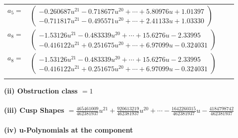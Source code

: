 \documentclass[1p]{elsarticle_modified}
\theoremstyle{definition}
\begin{document}
\begin{tabular}{m{7pt} m{180pt} m{7pt} m{180pt} }
\flushright $a_{5}=$&$\begin{pmatrix}-0.260687 u^{21}-0.718677 u^{20}+\cdots+5.80976 u+1.01397\\-0.711817 u^{21}-0.495571 u^{20}+\cdots+2.41133 u+1.03330\end{pmatrix}$ \\
\flushright $a_{8}=$&$\begin{pmatrix}-1.53126 u^{21}-0.483339 u^{20}+\cdots+15.6276 u-2.33995\\-0.416122 u^{21}+0.251675 u^{20}+\cdots+6.97099 u-0.324031\end{pmatrix}$\\ \flushright $a_{8}=$&$\begin{pmatrix}-1.53126 u^{21}-0.483339 u^{20}+\cdots+15.6276 u-2.33995\\-0.416122 u^{21}+0.251675 u^{20}+\cdots+6.97099 u-0.324031\end{pmatrix}$\\&\end{tabular}
\flushleft \textbf{(ii) Obstruction class $= 1$}\\~\\
\flushleft \textbf{(iii) Cusp Shapes $= \frac{465461009}{462381937} u^{21}+\frac{920613219}{462381937} u^{20}+\cdots-\frac{1642260315}{462381937} u-\frac{4184798742}{462381937}$}\\~\\
\newpage\renewcommand{\arraystretch}{1}
\flushleft \textbf{(iv) u-Polynomials at the component}\newline \\
\end{document}
